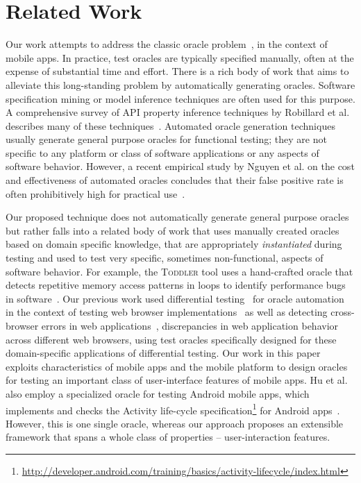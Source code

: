 \section{Related Work}
\label{relatedwork}

Our work attempts to address the classic oracle
problem~\cite{Oracle:Howden78,Weyuker80}, in the context of mobile
apps. In practice, test oracles are typically specified manually,
often at the expense of substantial time and effort. There is a rich
body of work that aims to alleviate this long-standing problem by
automatically generating oracles. Software specification mining or
model inference techniques are often used for this purpose. A
comprehensive survey of API property inference techniques by Robillard
et al. describes many of these
techniques~\cite{robillard13tse}. Automated oracle generation
techniques usually generate general purpose oracles for functional
testing; they are not specific to any platform or class of software
applications or any aspects of software behavior. However, a recent
empirical study by Nguyen et al. on the cost and effectiveness of
automated oracles concludes that their false positive rate is often
prohibitively high for practical use~\cite{Nguyen:2013}.

Our proposed technique does not automatically generate general purpose
oracles but rather falls into a related body of work that uses
manually created oracles based on domain specific knowledge, that are
appropriately \textit{instantiated} during testing and used to test
very specific, sometimes non-functional, aspects of software
behavior. For example, the \textsc{Toddler} tool uses a hand-crafted
oracle that detects repetitive memory access patterns in loops to
identify performance bugs in software~\cite{toddler:ICSE2013}.  Our
previous work used differential testing~\cite{McKeeman1998} for oracle
automation in the context of testing web browser
implementations~\cite{ZaeemKhurshid2012} as well as detecting
cross-browser errors in web applications~\cite{xpert:ICSE2013}, \ie
discrepancies in web application behavior across different web
browsers, using test oracles specifically designed for these
domain-specific applications of differential testing.
Our work in this paper
exploits characteristics of mobile apps and the mobile platform to
design oracles for testing an important class of user-interface
features of mobile apps.  Hu et al. also employ a specialized oracle
for testing Android mobile apps, which implements and checks the
Activity life-cycle
specification\footnote{\url{http://developer.android.com/training/basics/activity-lifecycle/index.html}}
for Android apps~\cite{Hu:2011:AST}.  However, this is one single
oracle, whereas our approach proposes an extensible framework that
spans a whole class of properties -- user-interaction features.

